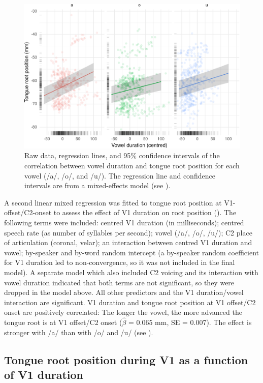 \documentclass[preprint]{JASAnew}
\begin{document}
\label{s:trp-vdur}

\begin{figure}[H]
\includegraphics[width=\linewidth]{./Figure5} \caption{Raw data, regression lines, and 95\% confidence intervals of the correlation between vowel duration and tongue root position for each vowel (/a/, /o/, and /u/). The regression line and confidence intervals are from a mixed-effects model (see ).}\label{f:Figure5}
\end{figure}

A second linear mixed regression was fitted to tongue root position at
V1-offset/C2-onset to assess the effect of V1 duration on root position
(). The following terms were included: centred
V1 duration (in milliseconds); centred speech rate (as number of
syllables per second); vowel (/a/, /o/, /u/); C2 place of articulation
(coronal, velar); an interaction between centred V1 duration and vowel;
by-speaker and by-word random intercept (a by-speaker random coefficient
for V1 duration led to non-convergence, so it was not included in the
final model). A separate model which also included C2 voicing and its
interaction with vowel duration indicated that both terms are not
significant, so they were dropped in the model above. All other
predictors and the V1 duration/vowel interaction are significant. V1
duration and tongue root position at V1 offset/C2 onset are positively
correlated: The longer the vowel, the more advanced the tongue root is
at V1 offset/C2 onset (\(\hat{\beta}\) = 0.065 mm, SE = 0.007). The
effect is stronger with /a/ than with /o/ and /u/ (see
).

\hypertarget{tongue-root-position-during-v1-as-a-function-of-v1-duration}{%
\subsection{Tongue root position during V1 as a function of V1
duration}\label{tongue-root-position-during-v1-as-a-function-of-v1-duration}}
\end{document}
